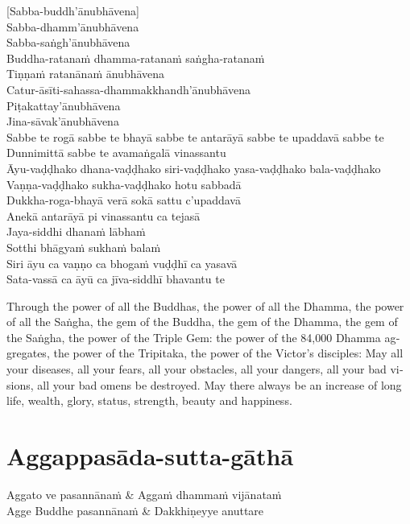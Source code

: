 [Sabba-buddh'ānubhāvena]\\
Sabba-dhamm'ānubhāvena\\
Sabba-saṅgh'ānubhāvena\\
Buddha-ratanaṁ dhamma-ratanaṁ saṅgha-ratanaṁ\\
Tiṇṇaṁ ratanānaṁ ānubhāvena\\
Catur-āsīti-sahassa-dhammakkhandh'ānubhāvena\\
Piṭakattay'ānubhāvena\\
Jina-sāvak'ānubhāvena\\
Sabbe te rogā sabbe te bhayā sabbe te antarāyā sabbe te upaddavā sabbe te\\
Dunnimittā sabbe te avamaṅgalā vinassantu\\
Āyu-vaḍḍhako dhana-vaḍḍhako siri-vaḍḍhako yasa-vaḍḍhako bala-vaḍḍhako\\
Vaṇṇa-vaḍḍhako sukha-vaḍḍhako hotu sabbadā\\
Dukkha-roga-bhayā verā sokā sattu c'upaddavā\\
Anekā antarāyā pi vinassantu ca tejasā\\
Jaya-siddhi dhanaṁ lābhaṁ\\
Sotthi bhāgyaṁ sukhaṁ balaṁ\\
Siri āyu ca vaṇṇo ca bhogaṁ vuḍḍhī ca yasavā\\
Sata-vassā ca āyū ca jīva-siddhī bhavantu te

\begin{english}
Through the power of all the Buddhas, the power of all the Dhamma, the power of all the Saṅgha, the gem of the Buddha, the gem of the Dhamma, the gem of the Saṅgha, the power of the Triple Gem: the power of the 84,000 Dhamma aggregates, the power of the Tripitaka, the power of the Victor’s disciples: May all your diseases, all your fears, all your obstacles, all your dangers, all your bad visions, all your bad omens be destroyed. May there always be an increase of long life, wealth, glory, status, strength, beauty and happiness.
\end{english}


\section{Aggappasāda-sutta-gāthā}

\begin{twochants}
  Aggato ve pasannānaṁ & Aggaṁ dhammaṁ vijānataṁ\\
  Agge Buddhe pasannānaṁ & Dakkhiṇeyye anuttare\\
\end{twochants}

